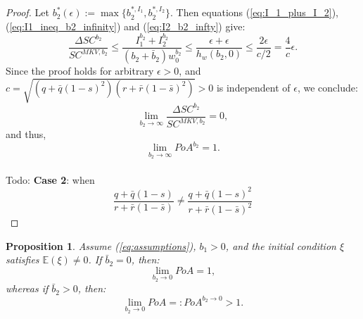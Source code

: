 \documentclass[11pt]{article}
\newtheorem{proposition}{Proposition}
\begin{document}
\begin{proof}
	Let $b_2^*(\epsilon) := \max \{ b_2^{*,I_1}, b_2^{*,I_2}\}$. Then equations (\ref{eq:I_1_plus_I_2}), (\ref{eq:I1_ineq_b2_infinity}) and (\ref{eq:I2_b2_infty}) give:
	\begin{equation*}
		\frac{\Delta SC^{b_2}}{SC^{MKV,b_2}} \leq \frac{I_1^{b_2} + I_2^{b_2}}{(b_2 + \bar{b}_2) w_0^{b_2}} \leq \frac{ \epsilon + \epsilon }{h_w(b_2,0)} \leq \frac{2\epsilon}{c/2}=\frac{4}{c}\epsilon.
	\end{equation*}
	Since the proof holds for arbitrary $\epsilon>0$, and $c=\sqrt{(q+\bar{q}(1-s)^2)(r+\bar{r}(1-\bar{s})^2)}>0$ is independent of $\epsilon$, we conclude:
	\begin{equation*}
		\lim_{b_2 \to \infty} \frac{\Delta SC^{b_2}}{SC^{MKV,b_2}} = 0, 
	\end{equation*}
	and thus,
	$$ \lim_{b_2 \to \infty} PoA^{b_2} = 1.$$\\
	
	Todo: 
	\textbf{Case 2}: when \begin{equation*}
	\frac{q+\bar{q}(1-s)}{r+\bar{r}(1-\bar{s})} \neq \frac{q+\bar{q}(1-s)^2}{r+\bar{r}(1-\bar{s})^2}
	\end{equation*}
\end{proof}

\begin{proposition}
	Assume (\ref{eq:assumptions}), $b_1 > 0$, and the initial condition $\xi$ satisfies $\mathbb{E}(\xi)\neq 0$. If $\bar{b}_2= 0$, then:
	\begin{equation*}
	\lim_{b_2 \to 0} PoA = 1,
	\end{equation*}
	whereas if $\bar{b}_2 > 0$, then:
	\begin{equation*}
	\lim_{b_2 \to 0} PoA =: PoA^{b_2\to 0} > 1.
	\end{equation*}
\label{prop:b2_to_0}
\end{proposition}
\end{document}
